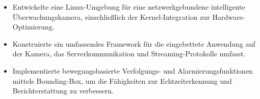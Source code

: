 \begin{itemize}
  \item Entwickelte eine Linux-Umgebung für eine netzwerkgebundene intelligente Überwachungskamera, einschließlich der Kernel-Integration zur Hardware-Optimierung.
  \item Konstruierte ein umfassendes Framework für die eingebettete Anwendung auf der Kamera, das Serverkommunikation und Streaming-Protokolle umfasst.
  \item Implementierte bewegungsbasierte Verfolgungs- und Alarmierungsfunktionen mittels Bounding-Box, um die Fähigkeiten zur Echtzeiterkennung und Berichterstattung zu verbessern.
\end{itemize}
\divider
